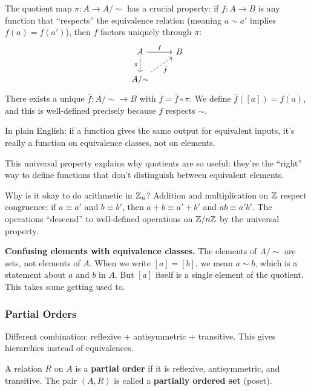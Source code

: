 \begin{keyresult}
The quotient map $\pi: A \to A/{\sim}$ has a crucial property: if $f: A \to B$ is any function that ``respects'' the equivalence relation (meaning $a \sim a'$ implies $f(a) = f(a')$), then $f$ factors uniquely through $\pi$:
\[
\begin{tikzcd}
A \arrow[r, "f"] \arrow[d, "\pi"'] & B \\
A/{\sim} \arrow[ur, dashed, "\bar{f}"'] &
\end{tikzcd}
\]
There exists a unique $\bar{f}: A/{\sim} \to B$ with $f = \bar{f} \circ \pi$. We define $\bar{f}([a]) = f(a)$, and this is well-defined precisely because $f$ respects $\sim$.

In plain English: if a function gives the same output for equivalent inputs, it's really a function on equivalence classes, not on elements.
\end{keyresult}

This universal property explains why quotients are so useful: they're the ``right'' way to define functions that don't distinguish between equivalent elements.

\begin{example}
Why is it okay to do arithmetic in $\mathbb{Z}_n$? Addition and multiplication on $\mathbb{Z}$ respect congruence: if $a \equiv a'$ and $b \equiv b'$, then $a + b \equiv a' + b'$ and $ab \equiv a'b'$. The operations ``descend'' to well-defined operations on $\mathbb{Z}/n\mathbb{Z}$ by the universal property.
\end{example}

\begin{commonmistake}
\textbf{Confusing elements with equivalence classes.} The elements of $A/{\sim}$ are sets, not elements of $A$. When we write $[a] = [b]$, we mean $a \sim b$, which is a statement about $a$ and $b$ in $A$. But $[a]$ itself is a single element of the quotient. This takes some getting used to.
\end{commonmistake}

\subsubsection*{Partial Orders}

Different combination: reflexive + antisymmetric + transitive. This gives hierarchies instead of equivalences.

\begin{definition}
A relation $R$ on $A$ is a \textbf{partial order} if it is reflexive, antisymmetric, and transitive. The pair $(A, R)$ is called a \textbf{partially ordered set} (poset).
\end{definition}


